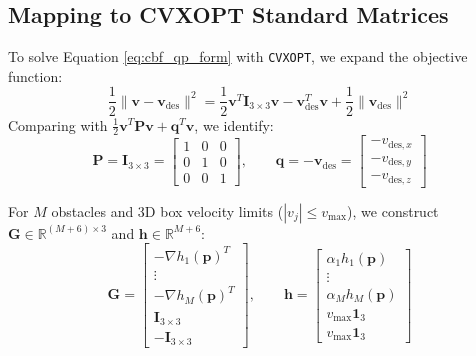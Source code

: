 \documentclass[11pt,a4paper]{article}
\begin{document}
\subsection{Mapping to CVXOPT Standard Matrices}
To solve Equation \eqref{eq:cbf_qp_form} with \texttt{CVXOPT}, we expand the objective function:
\begin{equation}
\frac{1}{2} \|\mathbf{v} - \mathbf{v}_{\mathrm{des}}\|^2 = \frac{1}{2} \mathbf{v}^T \mathbf{I}_{3 \times 3} \mathbf{v} - \mathbf{v}_{\mathrm{des}}^T \mathbf{v} + \frac{1}{2} \|\mathbf{v}_{\mathrm{des}}\|^2
\end{equation}
Comparing with $\frac{1}{2} \mathbf{v}^T \mathbf{P} \mathbf{v} + \mathbf{q}^T \mathbf{v}$, we identify:
\begin{equation}
\mathbf{P} = \mathbf{I}_{3 \times 3} = \begin{bmatrix} 1 & 0 & 0 \\ 0 & 1 & 0 \\ 0 & 0 & 1 \end{bmatrix}, \qquad
\mathbf{q} = -\mathbf{v}_{\mathrm{des}} = \begin{bmatrix} -v_{\mathrm{des}, x} \\ -v_{\mathrm{des}, y} \\ -v_{\mathrm{des}, z} \end{bmatrix}
\end{equation}

For $M$ obstacles and 3D box velocity limits ($|v_j| \le v_{\max}$), we construct $\mathbf{G} \in \mathbb{R}^{(M+6) \times 3}$ and $\mathbf{h} \in \mathbb{R}^{M+6}$:
\begin{equation}
\mathbf{G} = \begin{bmatrix}
-\nabla h_1(\mathbf{p})^T \\
\vdots \\
-\nabla h_M(\mathbf{p})^T \\
\mathbf{I}_{3 \times 3} \\
-\mathbf{I}_{3 \times 3}
\end{bmatrix}, \qquad
\mathbf{h} = \begin{bmatrix}
\alpha_1 h_1(\mathbf{p}) \\
\vdots \\
\alpha_M h_M(\mathbf{p}) \\
v_{\max} \mathbf{1}_3 \\
v_{\max} \mathbf{1}_3
\end{bmatrix}
\label{eq:cvxopt_cbf_mapping}
\end{equation}
\end{document}

